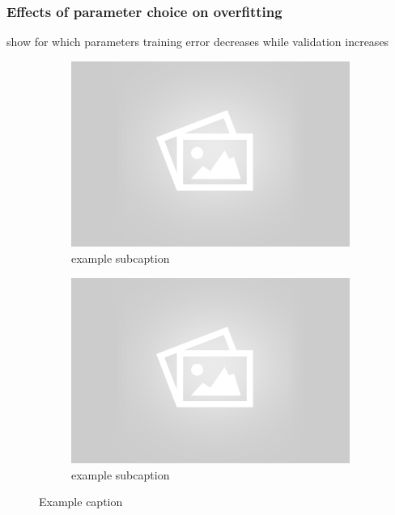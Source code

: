 \subsubsection{Effects of parameter choice on overfitting}
show for which parameters training error decreases while validation increases
	\begin{figure}[!ht]
	\centering
	\begin{subfigure}[b]{.45\textwidth}
	\centering
	\includegraphics[width=\textwidth]{mlp/placeholder.png}
	\caption{example subcaption}
	\end{subfigure}
	\quad
	\begin{subfigure}[b]{.45\textwidth}
	\centering
	\includegraphics[width=\textwidth]{mlp/placeholder.png}
	\caption{example subcaption}
	\label{fig:subfigure2}
	\end{subfigure}
	\caption{Example caption}
	\label{fig:example}
	\end{figure}

